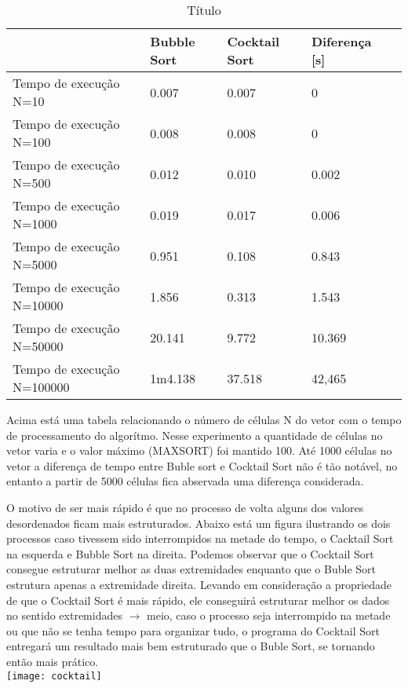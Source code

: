\documentclass[11pts]{book}
\begin{document}
\begin{table}
\caption{ Título}
\label{table:comoReferenciarTabela}
\begin{tabular}{|l|l||l|l|l|}
\hline \hline
& Bubble Sort & Cocktail Sort & Diferença [s]\\
\hline
Tempo de execução N=10  & 0.007 &  0.007& 0\\
\hline
Tempo de execução N=100  & 0.008  & 0.008 & 0 \\
\hline
Tempo de execução N=500  & 0.012  & 0.010 & 0.002\\
\hline
Tempo de execução N=1000  & 0.019  & 0.017 & 0.006\\
\hline
Tempo de execução N=5000  & 0.951  & 0.108  & 0.843\\
\hline
Tempo de execução N=10000  & 1.856  & 0.313  & 1.543\\
\hline
Tempo de execução N=50000  & 20.141  & 9.772  &10.369\\
\hline
Tempo de execução N=100000  & 1m4.138  & 37.518  &42,465\\
\hline \hline
\end{tabular}
\end{table}

Acima está uma tabela relacionando o número de células N do vetor com o tempo de processamento do algorítmo. Nesse experimento a quantidade de células no vetor varia e o valor máximo (MAXSORT) foi mantido 100. Até 1000 células no vetor a diferença de tempo entre Buble sort e Cocktail Sort não é tão notável, no entanto a partir de 5000 células fica abservada uma diferença considerada.

O motivo de ser mais rápido é que no processo de volta alguns dos valores desordenados ficam mais estruturados. Abaixo está um figura ilustrando os dois processos caso tivessem sido interrompidos na metade do tempo, o Cacktail Sort na esquerda e Bubble Sort na direita. Podemos observar que o Cocktail Sort consegue estruturar melhor as duas extremidades enquanto que o Buble Sort estrutura apenas a extremidade direita. Levando em consideração a propriedade de que o Cocktail Sort é mais rápido, ele conseguirá estruturar melhor os dados no sentido extremidades $\rightarrow$ meio, caso o processo seja interrompido na metade ou que não se tenha tempo para organizar tudo, o programa do Cocktail Sort entregará um resultado mais bem estruturado que o Buble Sort, se tornando então mais prático.\\
\texttt{[image: cocktail]}


\newpage
\end{document}
